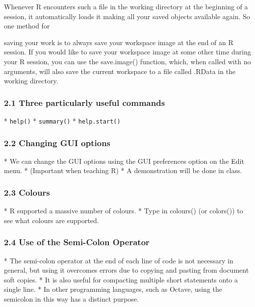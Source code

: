  
 Whenever R encounters such a file in the working directory at the beginning of a session,
 it automatically loads it making all your saved objects available again. So one method for
 
 saving your work is to always save your workspace image at the end of an R session. If you
 would like to save your workspace image at some other time during your R session, you can use
 the save.image() function, which, when called with no arguments, will also save the current
 workspace to a file called .RData in the working directory.
 
 
 
 
 \frametitle{2.1 Three particularly useful commands}
 
 
*  \texttt{help()}
*  \texttt{summary()}
*  \texttt{help.start()}

 
 
 
 \frametitle{2.2 Changing GUI options}
 
*  We can change the GUI options using the GUI preferences option on the Edit menu.
*   (Important
 when teaching R) 
*  A demonstration will be done in class.

 
 
 
 \frametitle{2.3 Colours}
 
*  R supported a massive number of colours.
*  Type in colours() (or colors()) to see what colours
 are supported.

 
 
 \frametitle{2.4 Use of the Semi-Colon Operator}
 
*  The semi-colon operator at the end of each line of code is not necessary in general, but using it
 overcomes errors due to copying and pasting from document soft copies. 
*  It is also useful for compacting multiple short statements onto a single line.
*  In other programming
 languages, such as Octave, using the semicolon in this way has a distinct purpose.

